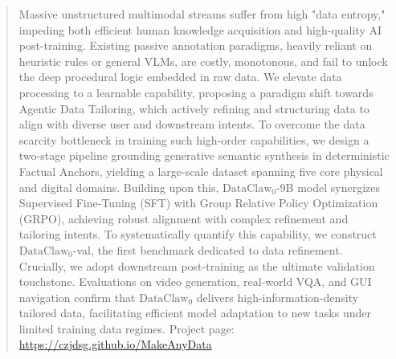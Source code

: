 \newcommand{\method}{TCF-Proto}

\begin{abstract}

Massive unstructured multimodal streams suffer from high "data entropy," impeding both efficient human knowledge acquisition and high-quality AI post-training. Existing passive annotation paradigms, heavily reliant on heuristic rules or general VLMs, are costly, monotonous, and fail to unlock the deep procedural logic embedded in raw data. We elevate data processing to a learnable capability, proposing a paradigm shift towards Agentic Data Tailoring, which actively refining and structuring data to align with diverse user and downstream intents. To overcome the data scarcity bottleneck in training such high-order capabilities, we design a two-stage pipeline grounding generative semantic synthesis in deterministic Factual Anchors, yielding a large-scale dataset spanning five core physical and digital domains. Building upon this, $\text{DataClaw}_0$-9B model synergizes Supervised Fine-Tuning (SFT) with Group Relative Policy Optimization (GRPO), achieving robust alignment with complex refinement and tailoring intents. To systematically quantify this capability, we construct $\text{DataClaw}_0$-val, the first benchmark dedicated to data refinement. Crucially, we adopt downstream post-training as the ultimate validation touchstone. Evaluations on video generation, real-world VQA, and GUI navigation confirm that $\text{DataClaw}_0$ delivers high-information-density tailored data, facilitating efficient model adaptation to new tasks under limited training data regimes. Project page: \url{https://czjdsg.github.io/MakeAnyData}
\end{abstract}
